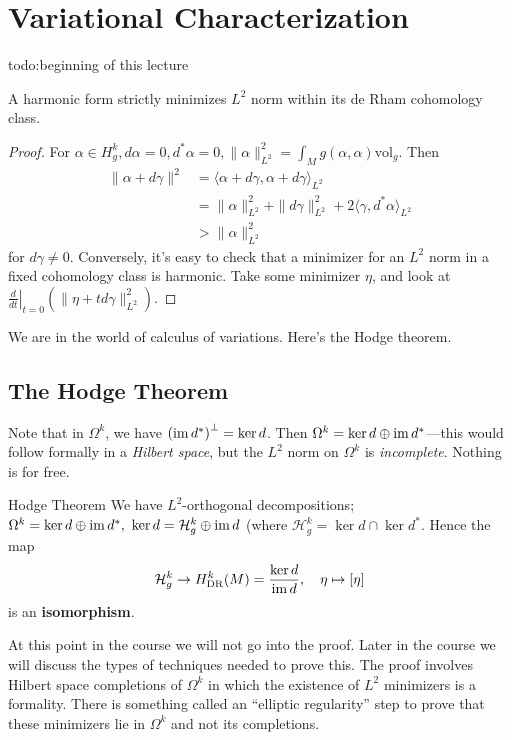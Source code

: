 \section{Variational Characterization} 
{\color{red}todo:beginning of this lecture} 
\begin{lemma}
    A harmonic form strictly minimizes $L^2$ norm within its de Rham cohomology class.
\end{lemma}
\begin{proof}
    For $\alpha  \in H_g^k, d\alpha  = 0, d^* \alpha  = 0, \| \alpha \|^2 _{L^2}=\int_M g(\alpha ,\alpha ) \mathrm{vol}_g$. Then 
    \begin{align*}
        \| \alpha  +d \gamma \|^2 &= \langle \alpha  + d\gamma , \alpha  + d \gamma  \rangle _{L^2}\\
                                  &= \| \alpha \|^2_{L^2}+ \|d \gamma \|^2 _{L^2}+ 2 \langle \gamma , d^* \alpha  \rangle _{L^2}\\
                                  &> \| \alpha \|^2 _{L^2}
    \end{align*}for $d\gamma \neq 0$. Conversely, it's easy to check that a  minimizer for an $L^2$ norm in a fixed cohomology class is harmonic. Take some minimizer $\eta$, and look at $\left. \frac{d}{dt} \right| _{t=0}\left( \| \eta  + t d \gamma \|^2 _{L^2} \right) $.
\end{proof}
We are in the world of calculus of variations. Here's the Hodge theorem.
\subsection{The Hodge Theorem}
Note that in $\Omega^k$, we have $\left( \operatorname{im} d^* \right) ^{\perp}= \ker d$. Then $\Omega^k = \ker d \oplus \operatorname{im} d^*$---this would follow formally in a \emph{Hilbert space}, but the $L^2$ norm on $\Omega^k$ is \emph{incomplete}. Nothing is for free.
\begin{namedthm}{Hodge Theorem} 
    We have $L^2$-orthogonal decompositions; $\Omega^k = \ker d \oplus \operatorname{im} d^*,\ \ker d = \mathcal H_g ^k \oplus \operatorname{im} d$ (where $\mathcal H_g^k = \ker d \cap  \ker d^*$. Hence the map  \[
        \mathcal H_g^k \to H_{\mathrm{DR}}^k (M) = \frac{\ker d}{\operatorname{im} d}, \quad \eta \mapsto  [\eta]
    \] is an \textbf{isomorphism}.
\end{namedthm}
At this point in the course we will not go into the proof. Later in the course we will discuss the types of techniques needed to prove this. The proof involves Hilbert space completions of $\Omega^k$ in which the existence of $L^2$ minimizers is a formality. There is something called an ``elliptic regularity'' step to prove that these minimizers lie in $\Omega^k$ and not its completions.

